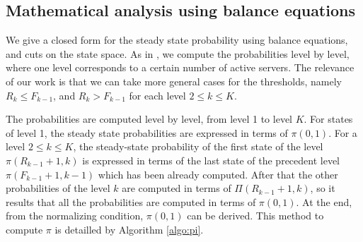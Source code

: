 \documentclass[conference]{IEEEtran}
\begin{document}
\subsection{Mathematical analysis using balance equations} %
We give a closed form for the steady state probability using balance equations, and cuts on the state space. 
As in \cite{le2000simple}, we compute the probabilities level by level,
where one level corresponds to a certain number of  active servers. 
The relevance of our work is that we can take more general cases for the thresholds, 
namely $R_{k} \leq F_{k-1}$, and  $R_{k} > F_{k-1}$ for each level $2 \leq k \leq K$.

The probabilities are computed level by level, from level 1 to level $K$.
For states of level 1,  the steady state probabilities  are expressed in terms of $\pi(0,1)$. For a level $2 \leq k \leq K$,  
the steady-state probability of the  first state of the level $\pi(R_{k-1}+1,k)$ is expressed in terms of the last state 
of the precedent level $\pi(F_{k-1}+1,k-1)$ which has been already computed. After that the other probabilities of the level 
$k$ are computed in terms of $\Pi(R_{k-1}+1,k)$, so it results that all the probabilities  are computed in terms of 
$\pi(0,1)$. At the end, from the normalizing condition, $\pi(0,1)$ can be derived. 
This method to compute $\pi$ is detailled by Algorithm \ref{algo:pi}.
\end{document}
